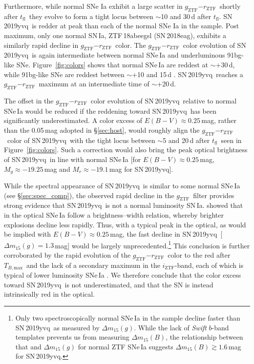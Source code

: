 \documentclass[twocolumn]{aastex63}
\newcommand{\rztf}{$r_\mathrm{ZTF}$}
\newcommand{\gztf}{$g_\mathrm{ZTF}$}
\newcommand{\iztf}{$i_\mathrm{ZTF}$}
\newcommand{\tfl}{$t_\mathrm{fl}$}
\newcommand{\tbmax}{$T_{B,\mathrm{max}}$}
\newcommand{\sn}{SN\,2019yvq}
\begin{document}
Furthermore, while normal SNe Ia exhibit a large scatter in \gztf$ - $\rztf\
shortly after \tfl\ they evolve to form a tight locus between $\sim$10 and
30\,d after \tfl. \sn\ is redder at peak than each of the normal SNe Ia in the
\citet{Bulla20} sample. Post maximum, only one normal SN\,Ia, ZTF\,18abeegsl
(SN\,2018eag), exhibits a similarly rapid decline in \gztf$ - $\rztf\ color.
The \gztf$ - $\rztf\ color evolution of \sn\ is again intermediate between
normal SNe\,Ia and underluminous 91bg-like SNe. Figure~\ref{fig:colors} shows
that normal SNe\,Ia are reddest at $\sim$+30\,d, while 91bg-like SNe are
reddest between $\sim$+10 and 15\,d \citep{Burns14}. \sn\ reaches a
\gztf$-$\rztf\ maximum at an intermediate time of $\sim$+20\,d.



The offset in the \gztf$ - $\rztf\ color evolution of \sn\ relative to normal
SNe\,Ia would be reduced if the reddening toward \sn\ has been significantly
underestimated. A color excess of $E(B-V) \approx 0.25$\,mag, rather than the
0.05\,mag adopted in \S\ref{sec:host}, would roughly align the \gztf$ -
$\rztf\ color of \sn\ with the tight locus between $\sim$5 and 20\,d after
\tfl\ seen in Figure~\ref{fig:colors}. Such a correction would also bring the
peak optical brightness of \sn\ in line with normal SNe\,Ia [for $E(B-V)
\approx 0.25$\,mag, $M_g \approx -19.25$\,mag and $M_r \approx -19.1$\,mag for
\sn].

While the spectral appearance of \sn\ is similar to some normal SNe\,Ia (see
\S\ref{sec:spec_comp}), the observed rapid decline in the \gztf\ filter
provides strong evidence that \sn\ is not a normal luminosity SN\,Ia.
\citet{Phillips93} showed that in the optical SNe\,Ia follow a
brightness--width relation, whereby brighter explosions decline less rapidly.
Thus, with a typical peak in the optical, as would be implied with $E(B-V)
\approx 0.25$\,mag, the fast decline in \sn\ [$\Delta m_{15}(g) = 1.3$\,mag]
would be largely unprecedented.\footnote{Only two spectroscopically normal
SNe\,Ia in the \citet{Yao19} sample decline faster than \sn\ as measured by
$\Delta m_{15}(g)$. While the lack of \textit{Swift} $b$-band templates
prevents us from measuring $\Delta m_{15}(B)$, the relationship between that
and $\Delta m_{15}(g)$ for normal ZTF SNe\,Ia suggests $\Delta m_{15}(B)
\gtrsim 1.6$\,mag for \sn.} This conclusion is further corroborated by the
rapid evolution of the \gztf$-$\rztf\ color to the red after \tbmax\ and the
lack of a secondary maximum in the \iztf-band, each of which is typical of
lower luminosity SNe\,Ia \citep[see][and references therein]{Taubenberger17}.
We therefore conclude that the color excess toward \sn\ is not
underestimated, and that the SN is instead intrinsically red in the optical.
\end{document}
